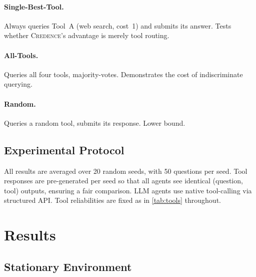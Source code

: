 \documentclass[11pt]{article}
\newcommand{\credence}{\textsc{Credence}}
\begin{document}
\paragraph{Single-Best-Tool.} Always queries Tool~A (web search, cost~1) and submits its answer. Tests whether \credence{}'s advantage is merely tool routing.

\paragraph{All-Tools.} Queries all four tools, majority-votes. Demonstrates the cost of indiscriminate querying.

\paragraph{Random.} Queries a random tool, submits its response. Lower bound.

\subsection{Experimental Protocol}

All results are averaged over 20 random seeds, with 50 questions per seed. Tool responses are pre-generated per seed so that all agents see identical (question, tool) outputs, ensuring a fair comparison. LLM agents use native tool-calling via structured API. Tool reliabilities are fixed as in \cref{tab:tools} throughout.


\section{Results}
\label{sec:results}

\subsection{Stationary Environment}
\end{document}
